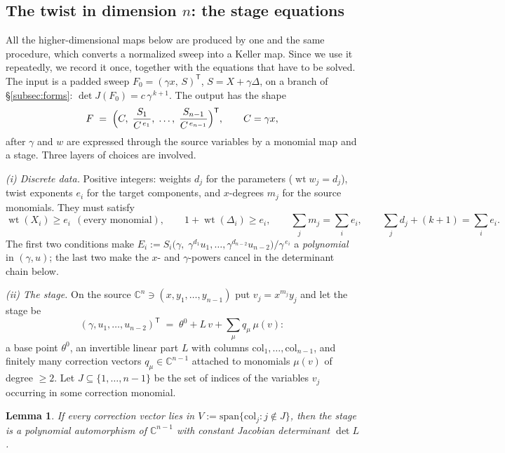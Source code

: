 \documentclass[11pt]{article}
\theoremstyle{plain}
\newtheorem{lemma}[theorem]{Lemma}
\theoremstyle{definition}
\theoremstyle{remark}
\newcommand{\C}{\mathbb{C}}
\begin{document}
\subsection{The twist in dimension $n$: the stage equations}\label{subsec:stage}

All the higher-dimensional maps below are produced by one and the same
procedure, which converts a normalized sweep into a Keller map. Since we use
it repeatedly, we record it once, together with the equations that have to be
solved. The input is a padded sweep $F_0=(\gamma x,\,S)^{\mathsf T}$,
$S=X+\gamma\Delta$, on a branch of \S\ref{subsec:forms}:
$\det J(F_0)=c\,\gamma^{\,k+1}$. The output has the shape
\[
F\;=\;\Bigl(C,\;\frac{S_1}{C^{\,e_1}},\;\dots,\;
\frac{S_{n-1}}{C^{\,e_{n-1}}}\Bigr)^{\mathsf T},
\qquad C=\gamma x ,
\]
after $\gamma$ and $w$ are expressed through the source variables by a
monomial map and a stage. Three layers of choices are involved.

\emph{(i) Discrete data.} Positive integers: weights $d_j$ for the parameters
($\operatorname{wt}w_j=d_j$), twist exponents $e_i$ for the target components,
and $x$-degrees $m_j$ for the source monomials. They must satisfy
\begin{equation}\label{eq:discrete}
\operatorname{wt}(X_i)\ge e_i\ \ (\text{every monomial}),\qquad
1+\operatorname{wt}(\Delta_i)\ge e_i,\qquad
\sum_j m_j=\sum_i e_i,\qquad
\sum_j d_j+(k+1)=\sum_i e_i .
\end{equation}
The first two conditions make
$E_i:=S_i\bigl(\gamma,\;\gamma^{d_1}u_1,\dots,\gamma^{d_{n-2}}u_{n-2}\bigr)
/\gamma^{\,e_i}$ a \emph{polynomial} in $(\gamma,u)$; the last two make the
$x$- and $\gamma$-powers cancel in the determinant chain below.

\emph{(ii) The stage.} On the source $\C^n\ni(x,y_1,\dots,y_{n-1})$ put
$v_j=x^{m_j}y_j$ and let the stage be
\[
(\gamma,u_1,\dots,u_{n-2})^{\mathsf T}
\;=\;\theta^0+L\,v+\textstyle\sum_\mu q_\mu\,\mu(v):
\]
a base point $\theta^0$, an invertible linear part $L$ with columns
$\mathrm{col}_1,\dots,\mathrm{col}_{n-1}$, and finitely many correction
vectors $q_\mu\in\C^{n-1}$ attached to monomials $\mu(v)$ of degree $\ge2$.
Let $J\subseteq\{1,\dots,n-1\}$ be the set of indices of the variables $v_j$
occurring in some correction monomial.

\begin{lemma}\label{lem:stage}
If every correction vector lies in
$V:=\mathrm{span}\{\mathrm{col}_j:j\notin J\}$, then the stage is a polynomial
automorphism of $\C^{n-1}$ with constant Jacobian determinant $\det L$.
\end{lemma}
\end{document}

